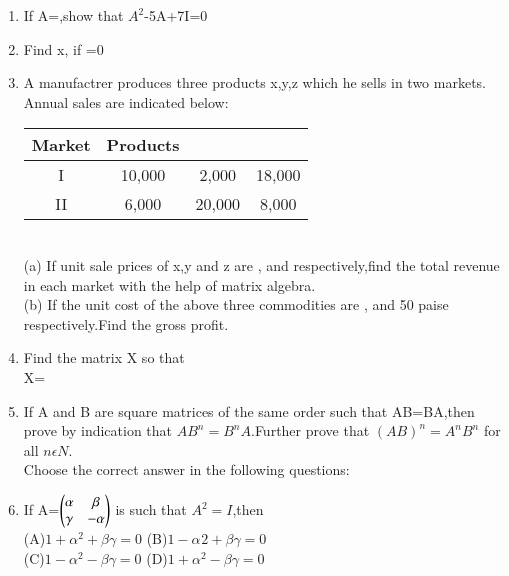 \begin{enumerate}[label=\arabic*.,ref=\thesubsection.\theenumi]
  \item If A=,show that $A^{2}$-5A+7I=0\\
  \item Find x, if =0\\
  \item A manufactrer produces three products x,y,z which he sells in two markets. Annual sales are indicated below:\\
 
  \begin{tabular}{cccc}
  \hline
  Market & Products\\
  \hline
  I &10,000 &2,000 &18,000\\
  \hline
  II &6,000 &20,000 &8,000\\
  \hline
  \end{tabular}\\
  (a) If unit sale prices of x,y and z are , and  respectively,find the total revenue in each market with the help of matrix algebra.\\
  (b) If the unit cost of the above three commodities are , and 50 paise respectively.Find the gross profit.\\
  \item Find the matrix X so that\\ X=\\
  \item If A and B are square matrices of the same order such that AB=BA,then prove by indication that $AB^{n}=B^{n}A$.Further prove that $(AB)^{n}=A^{n}B^{n}$ for all $n \epsilon N$.\\
  Choose the correct answer in the following questions:\\
  \item If A=$\begin{pmatrix}\alpha &\beta\\ \gamma &-\alpha\end{pmatrix}$ is such that $A^{2}=I$,then\\
  (A)$1+\alpha^{2}+\beta\gamma=0$ (B)$1-\alpha^{}2+\beta\gamma=0$\\
  (C)$1-\alpha^{2}-\beta\gamma=0$ (D)$1+\alpha^{2}-\beta\gamma=0$\\

\end{enumerate}
